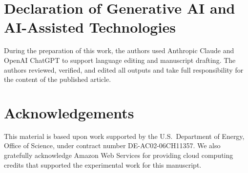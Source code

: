 \documentclass[preprint,12pt, a4paper]{elsarticle}
\begin{document}
\section*{Declaration of Generative AI and AI-Assisted Technologies}
During the preparation of this work, the authors used Anthropic Claude and OpenAI ChatGPT to support language editing and manuscript drafting. The authors reviewed, verified, and edited all outputs and take full responsibility for the content of the published article.

\section*{Acknowledgements}
\label{}
This material is based upon work supported by the U.S.\ Department of Energy, Office of Science, under contract number DE-AC02-06CH11357. We also gratefully acknowledge Amazon Web Services for providing cloud computing credits that supported the experimental work for this manuscript.



\end{document}
